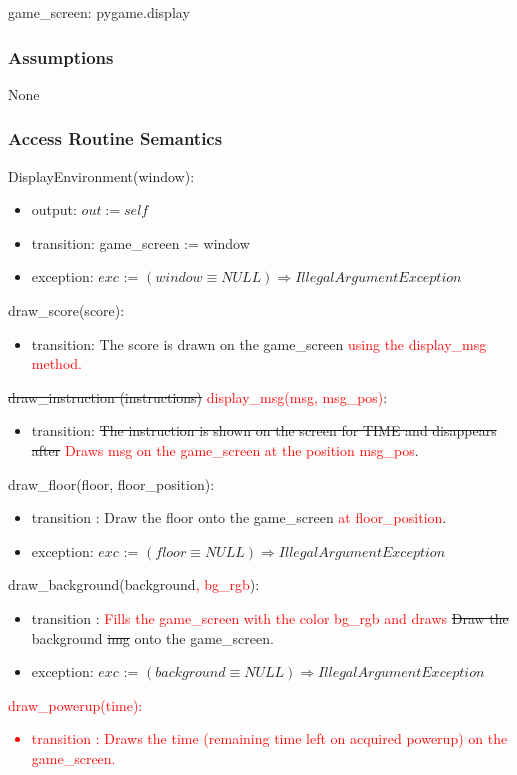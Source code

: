 \documentclass[12pt]{article}
\begin{document}
game\_screen: pygame.display

\subsubsection* {Assumptions}

None

\subsubsection* {Access Routine Semantics}
\noindent DisplayEnvironment(window):
\begin{itemize}
    \item output: $out := self$
    \item transition: game\_screen := window
    \item exception: $exc$ := $(window \equiv NULL) \Rightarrow IllegalArgumentException $
\end{itemize}

\noindent draw\_score(score):
\begin{itemize}
    \item transition: The score is drawn on the game\_screen \textcolor{red}{using the display\_msg method.}
\end{itemize}

\noindent \sout{draw\_instruction (instructions)} \textcolor{red}{display\_msg(msg, msg\_pos)}:
\begin{itemize}
    \item transition: \sout{The instruction is shown on the screen for TIME and disappears after} \textcolor{red}{Draws msg on the game\_screen at the position msg\_pos}.
\end{itemize}

\noindent draw\_floor(floor, floor\_position):
\begin{itemize}
    \item transition : Draw the floor onto the game\_screen \textcolor{red}{at floor\_position}.
    \item exception: $exc$ := $(floor \equiv NULL) \Rightarrow IllegalArgumentException $
\end{itemize}

\noindent draw\_background(background\textcolor{red}{, bg\_rgb}):
\begin{itemize}
    \item transition : \textcolor{red}{Fills the game\_screen with the color bg\_rgb and draws} \sout{Draw the} background \sout{img} onto the game\_screen.
    \item exception: $exc$ := $(background \equiv NULL) \Rightarrow IllegalArgumentException $
\end{itemize}
\textcolor{red}{
\noindent draw\_powerup(time):
\begin{itemize}
    \item transition : Draws the time (remaining time left on acquired powerup) on the game\_screen.
\end{itemize}
}
\end{document}
